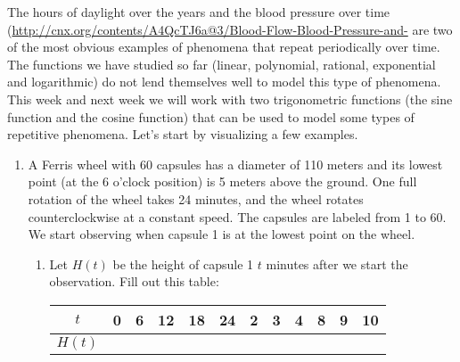 \documentclass[11pt,dvipsnames]{article}
\begin{document}
\thispagestyle{empty}
The hours of daylight over the years and  the blood pressure over time (\url{http://cnx.org/contents/A4QcTJ6a@3/Blood-Flow-Blood-Pressure-and-} are two of the most obvious examples of phenomena that repeat periodically over time. The functions we have studied so far (linear, polynomial, rational, exponential and logarithmic) do not lend themselves well to model this type of phenomena. This week and next week we will work with two trigonometric functions (the sine function and the cosine function) that can be used to model some types of repetitive phenomena. Let's start by visualizing a few examples.  
\begin{enumerate}[label= {\bf  \arabic*:}]
\item A Ferris wheel with 60 capsules has a diameter of 110 meters and its lowest point (at the 6 o'clock position) is 5 meters above the ground. One full rotation of the wheel takes 24 minutes, and the wheel rotates counterclockwise at a constant speed. The capsules are labeled from 1 to 60. We start observing when capsule 1 is at the lowest point on the wheel. 
\begin{enumerate}
\item Let $H(t)$ be the height of capsule 1 $t$ minutes after we start the observation. Fill out this table:

\begin{minipage}{\linewidth}
\centering
\begin{tabularx}{0.8\textwidth}{|X|X|X|X|X|X|X|X|X|X|X|X|X|}
\hline
\multicolumn{2}{|c|}{$t$}         &0&6& 12 & 18 & 24 & 2 & 3 & 4 &8&9&10\\ \hline
\multicolumn{2}{|c|}{$H(t)$}   & & &     &     &     &     &     && & &     \\ \hline
\end{tabularx}
\end{minipage}


\end{enumerate}
\end{enumerate}
\end{document}
